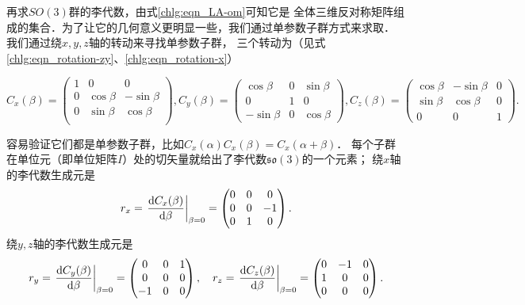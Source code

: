再求$SO(3)$群的李代数，由式\eqref{chlg:eqn_LA-om}可知它是
全体三维反对称矩阵组成的集合．为了让它的几何意义更明显一些，我们通过单参数子群方式来求取．
我们通过绕$x,y,z$轴的转动来寻找单参数子群，
三个转动为（见式\eqref{chlg:eqn_rotation-zy}、\eqref{chlg:eqn_rotation-x}）
\begin{small}
\setlength{\mathindent}{0em}
\begin{equation*}
    {C_x}( \beta  ) = \begin{pmatrix}
        1&0&0 \\
        0&{\cos \beta }&{ - \sin \beta } \\
        0&{\sin \beta }&{\cos \beta } \\
    \end{pmatrix}, 
{C_y}( \beta ) = \begin{pmatrix}
    {\cos \beta }&0&{  \sin \beta }  \\
    0&1&0\\
    { - \sin \beta } &0&{\cos \beta }
\end{pmatrix} ,
    {C_z}( \beta  ) =  \begin{pmatrix}
    {\cos \beta }&{ - \sin \beta }&0 \\
    {\sin \beta }&{\cos \beta }&0 \\
    0&0&1
\end{pmatrix} .
\end{equation*} \setlength{\mathindent}{2em}
\end{small}
容易验证它们都是单参数子群，比如$C_x(\alpha)C_x(\beta)=C_x(\alpha+\beta)$．
每个子群在单位元（即单位矩阵$I$）处的切矢量就给出了李代数$\mathfrak{so}(3)$的一个元素；
绕$x$轴的李代数生成元是
\begin{equation}
    r_x=\left.\frac{{\rm d}C_x(\beta)}{{\rm d}\beta}\right|_{\beta=0}
    =\begin{pmatrix}
        0 & 0 & 0 \\
        0& 0 & -1 \\
        0 & 1 & 0
    \end{pmatrix}.
\end{equation}
绕$y,z$轴的李代数生成元是
\begin{equation*}
    r_y=\left.\frac{{\rm d}C_y(\beta)}{{\rm d}\beta}\right|_{\beta=0}
    =\begin{pmatrix}
        0 & 0 & 1 \\
        0 & 0 & 0 \\
        -1 & 0 & 0
    \end{pmatrix},\quad
    r_z=\left.\frac{{\rm d}C_z(\beta)}{{\rm d}\beta}\right|_{\beta=0}
    =\begin{pmatrix}
        0 & - 1 & 0 \\
        1& 0 & 0 \\
        0 & 0 & 0
    \end{pmatrix} .
\end{equation*}
